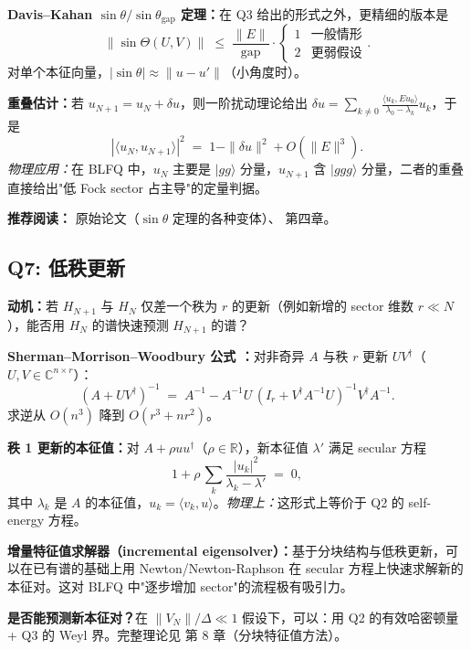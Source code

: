 \documentclass{article}
\begin{document}
\textbf{Davis--Kahan $\sin\theta/\sin\theta_{\mathrm{gap}}$ 定理：}在 Q3 给出的形式之外，更精细的版本是
\[
\|\sin\Theta(U,V)\| \;\le\; \frac{\|E\|}{\mathrm{gap}}\cdot\begin{cases}1 & \text{一般情形}\\ 2 & \text{更弱假设}\end{cases}.
\]
对单个本征向量，$|\sin\theta|\approx \|u-u'\|$（小角度时）。

\textbf{重叠估计：}若 $u_{N+1}=u_{N}+\delta u$，则一阶扰动理论给出 $\delta u=\sum_{k\ne 0}\frac{\langle u_{k},E u_{0}\rangle}{\lambda_{0}-\lambda_{k}}u_{k}$，于是
\[
|\langle u_{N},u_{N+1}\rangle|^{2} \;=\; 1 - \|\delta u\|^{2} + O(\|E\|^{3}).
\]
\emph{物理应用：}在 BLFQ 中，$u_{N}$ 主要是 $|gg\rangle$ 分量，$u_{N+1}$ 含 $|ggg\rangle$ 分量，二者的重叠直接给出"低 Fock sector 占主导"的定量判据。

\textbf{推荐阅读：}\cite{Davis_Kahan_1970} 原始论文（$\sin\theta$ 定理的各种变体）、\cite{Stewart_Sun_1990} 第四章。

\subsection{Q7: 低秩更新}

\textbf{动机：}若 $H_{N+1}$ 与 $H_{N}$ 仅差一个秩为 $r$ 的更新（例如新增的 sector 维数 $r\ll N$），能否用 $H_{N}$ 的谱快速预测 $H_{N+1}$ 的谱？

\textbf{Sherman--Morrison--Woodbury 公式 \cite{Sherman_Morrison_1950,Woodbury_1950}：}对非奇异 $A$ 与秩 $r$ 更新 $UV^{\dagger}$（$U,V\in\mathbb{C}^{n\times r}$）：
\[
(A+UV^{\dagger})^{-1} \;=\; A^{-1} - A^{-1}U\,(I_{r}+V^{\dagger}A^{-1}U)^{-1}V^{\dagger}A^{-1}.
\]
求逆从 $O(n^{3})$ 降到 $O(r^{3}+nr^{2})$。

\textbf{秩 1 更新的本征值：}对 $A+\rho uu^{\dagger}$（$\rho\in\mathbb{R}$），新本征值 $\lambda'$ 满足 secular 方程
\[
1+\rho\,\sum_{k}\frac{|u_{k}|^{2}}{\lambda_{k}-\lambda'} \;=\; 0,
\]
其中 $\lambda_{k}$ 是 $A$ 的本征值，$u_{k}=\langle v_{k},u\rangle$。\emph{物理上：}这形式上等价于 Q2 的 self-energy 方程。

\textbf{增量特征值求解器（incremental eigensolver）：}基于分块结构与低秩更新，可以在已有谱的基础上用 Newton/Newton-Raphson 在 secular 方程上快速求解新的本征对。这对 BLFQ 中"逐步增加 sector"的流程极有吸引力。

\textbf{是否能预测新本征对？}在 $\|V_{N}\|/\Delta\ll 1$ 假设下，可以：用 Q2 的有效哈密顿量 + Q3 的 Weyl 界。完整理论见 \cite{Golub_VanLoan_2013} 第 8 章（分块特征值方法）。
\end{document}
